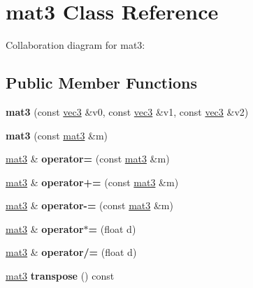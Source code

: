 \hypertarget{classmat3}{\section{mat3 Class Reference}
\label{classmat3}
}


Collaboration diagram for mat3\+:
\subsection*{Public Member Functions}
\begin{DoxyCompactItemize}
\item 
\hypertarget{classmat3_a5e327d985b68ef2a0cc46fb417aefeaf}{{\bfseries mat3} (const \hyperlink{classvec3}{vec3} \&v0, const \hyperlink{classvec3}{vec3} \&v1, const \hyperlink{classvec3}{vec3} \&v2)}\label{classmat3_a5e327d985b68ef2a0cc46fb417aefeaf}

\item 
\hypertarget{classmat3_a0427bedc9ba6cb374d89618293dda305}{{\bfseries mat3} (const \hyperlink{classmat3}{mat3} \&m)}\label{classmat3_a0427bedc9ba6cb374d89618293dda305}

\item 
\hypertarget{classmat3_a5e2191dc318a5bfbdb45ba695da90a7f}{\hyperlink{classmat3}{mat3} \& {\bfseries operator=} (const \hyperlink{classmat3}{mat3} \&m)}\label{classmat3_a5e2191dc318a5bfbdb45ba695da90a7f}

\item 
\hypertarget{classmat3_a5afea6651ce57716e6e80f90c1001bbd}{\hyperlink{classmat3}{mat3} \& {\bfseries operator+=} (const \hyperlink{classmat3}{mat3} \&m)}\label{classmat3_a5afea6651ce57716e6e80f90c1001bbd}

\item 
\hypertarget{classmat3_af99c2cc186192a7a89ece245ed071762}{\hyperlink{classmat3}{mat3} \& {\bfseries operator-\/=} (const \hyperlink{classmat3}{mat3} \&m)}\label{classmat3_af99c2cc186192a7a89ece245ed071762}

\item 
\hypertarget{classmat3_a0ffea300f2e7f7b43148b242556bf90c}{\hyperlink{classmat3}{mat3} \& {\bfseries operator$\ast$=} (float d)}\label{classmat3_a0ffea300f2e7f7b43148b242556bf90c}

\item 
\hypertarget{classmat3_ab13aff14d959bd6f7bf938c0fbdd5643}{\hyperlink{classmat3}{mat3} \& {\bfseries operator/=} (float d)}\label{classmat3_ab13aff14d959bd6f7bf938c0fbdd5643}

\item 
\hypertarget{classmat3_a37e0d98b86201148018d5f6ebefed605}{\hyperlink{classmat3}{mat3} {\bfseries transpose} () const }\label{classmat3_a37e0d98b86201148018d5f6ebefed605}


\end{DoxyCompactItemize}
